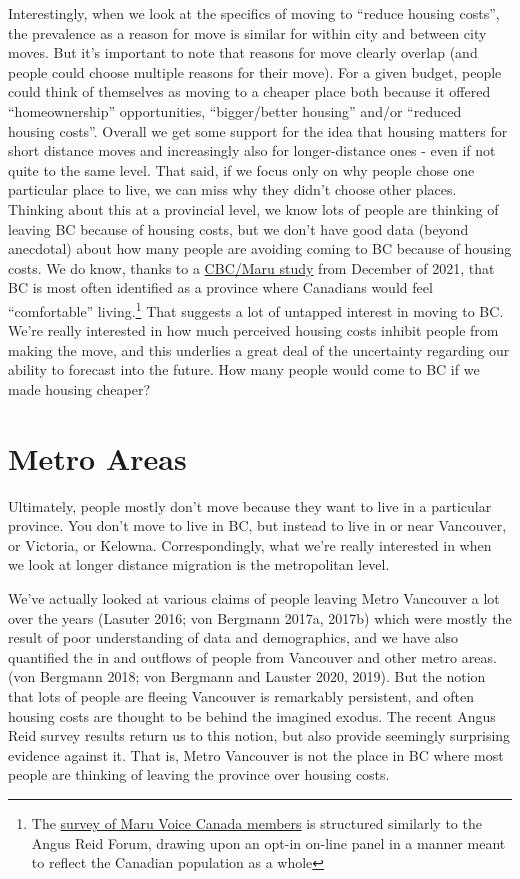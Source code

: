 \documentclass[
  letterpaper,
]{article}
\begin{document}
Interestingly, when we look at the specifics of moving to ``reduce
housing costs'', the prevalence as a reason for move is similar for
within city and between city moves. But it's important to note that
reasons for move clearly overlap (and people could choose multiple
reasons for their move). For a given budget, people could think of
themselves as moving to a cheaper place both because it offered
``homeownership'' opportunities, ``bigger/better housing'' and/or
``reduced housing costs''. Overall we get some support for the idea that
housing matters for short distance moves and increasingly also for
longer-distance ones - even if not quite to the same level. That said,
if we focus only on why people chose one particular place to live, we
can miss why they didn't choose other places. Thinking about this at a
provincial level, we know lots of people are thinking of leaving BC
because of housing costs, but we don't have good data (beyond anecdotal)
about how many people are avoiding coming to BC because of housing
costs. We do know, thanks to a
\href{https://www.cbc.ca/news/canada/calgary/poll-canadians-comfortable-living-1.6302361}{CBC/Maru
study} from December of 2021, that BC is most often identified as a
province where Canadians would feel ``comfortable'' living.\footnote{The
  \href{https://www.marugroup.net/public-opinion-polls/canada/living-comfortably-elsewhere}{survey
  of Maru Voice Canada members} is structured similarly to the Angus
  Reid Forum, drawing upon an opt-in on-line panel in a manner meant to
  reflect the Canadian population as a whole} That suggests a lot of
untapped interest in moving to BC. We're really interested in how much
perceived housing costs inhibit people from making the move, and this
underlies a great deal of the uncertainty regarding our ability to
forecast into the future. How many people would come to BC if we made
housing cheaper?

\section{Metro Areas}\label{metro-areas}

Ultimately, people mostly don't move because they want to live in a
particular province. You don't move to live in BC, but instead to live
in or near Vancouver, or Victoria, or Kelowna. Correspondingly, what
we're really interested in when we look at longer distance migration is
the metropolitan level.

We've actually looked at various claims of people leaving Metro
Vancouver a lot over the years (Lasuter 2016; von Bergmann 2017a, 2017b)
which were mostly the result of poor understanding of data and
demographics, and we have also quantified the in and outflows of people
from Vancouver and other metro areas. (von Bergmann 2018; von Bergmann
and Lauster 2020, 2019). But the notion that lots of people are fleeing
Vancouver is remarkably persistent, and often housing costs are thought
to be behind the imagined exodus. The recent Angus Reid survey results
return us to this notion, but also provide seemingly surprising evidence
against it. That is, Metro Vancouver is not the place in BC where most
people are thinking of leaving the province over housing costs.
\end{document}
